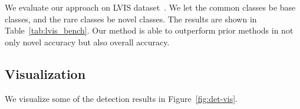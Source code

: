 We evaluate our approach on LVIS dataset~\cite{gupta2019lvis}. We let the common classes be base classes, and the rare classes be novel classes. The results are shown in Table~\ref{tab:lvis_bench}. Our method is able to outperform prior methods in not only novel accuracy but also overall accuracy.

\subsection{Visualization}
\label{sec:vis}
We visualize some of the detection results in Figure~\ref{fig:det-vis}.

{%
\begin{figure}[!ht]
	\centering
	\footnotesize
	\setlength{\tabcolsep}{0.1em}
\end{figure}}
